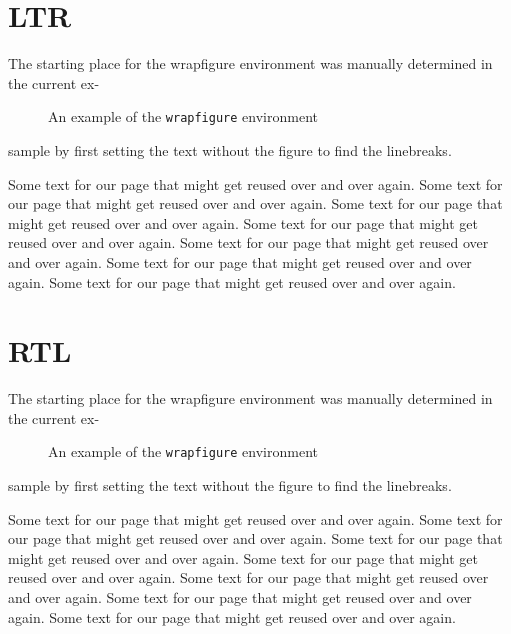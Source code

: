 \documentclass{article}
\newcommand\sample{Some text for our page
  that might get reused over and over again. }
\begin{document}
\section{LTR}
The starting place for the wrapfigure
environment was manually determined in
the current ex-

\begin{figure}
  \centering
  \caption{An example of the
    \texttt{wrapfigure} environment}
\end{figure}
sample by first setting the text without
the figure to find the linebreaks.

\sample \sample \sample\sample \sample \sample\sample

\section{RTL}

\setRTL
The starting place for the wrapfigure
environment was manually determined in
the current ex-

\begin{figure}
  \centering
  \caption{An example of the
    \texttt{wrapfigure} environment}
\end{figure}
sample by first setting the text without
the figure to find the linebreaks.

\sample \sample \sample\sample \sample \sample\sample
\end{document}
